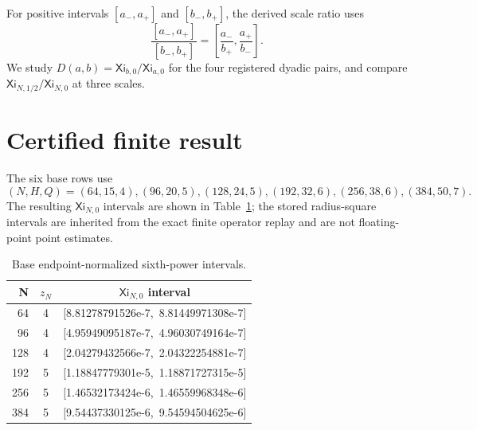 \documentclass[11pt]{article}
\newcommand{\XiN}{\mathsf{Xi}}
\begin{document}
For positive intervals \([a_-,a_+]\) and \([b_-,b_+]\), the derived scale ratio
uses
\[
 \frac{[a_-,a_+]}{[b_-,b_+]}=
 \left[\frac{a_-}{b_+},\frac{a_+}{b_-}\right].
 \tag{3}
\]
We study \(D(a,b)=\XiN_{b,0}/\XiN_{a,0}\) for the four registered dyadic
pairs, and compare \(\XiN_{N,1/2}/\XiN_{N,0}\) at three scales.

\section{Certified finite result}
The six base rows use
\[
 (N,H,Q)=(64,15,4),(96,20,5),(128,24,5),
 (192,32,6),(256,38,6),(384,50,7).
\]
The resulting \(\XiN_{N,0}\) intervals are shown in Table~\ref{tab:base}; the
stored radius-square intervals are inherited from the exact finite operator
replay and are not floating-point point estimates.

\begin{table}[t]
\centering
\caption{Base endpoint-normalized sixth-power intervals.}
\label{tab:base}
\small
\begin{tabular}{rcc}
\toprule
N & \(z_N\) & \(\XiN_{N,0}\) interval\\
\midrule
64  &4& [8.81278791526e-7,\ 8.81449971308e-7]\\
96  &4& [4.95949095187e-7,\ 4.96030749164e-7]\\
128 &4& [2.04279432566e-7,\ 2.04322254881e-7]\\
192 &5& [1.18847779301e-5,\ 1.18871727315e-5]\\
256 &5& [1.46532173424e-6,\ 1.46559968348e-6]\\
384 &5& [9.54437330125e-6,\ 9.54594504625e-6]\\
\bottomrule
\end{tabular}
\end{table}
\end{document}
